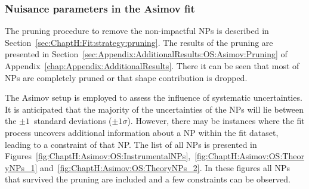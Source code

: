 \subsubsection{Nuisance parameters in the \dilepOStau Asimov fit}
\label{sec:ChaptH:Fit:ASIMOV:OS:NPs}

The pruning procedure to remove the non-impactful NPs is described in Section~\ref{sec:ChaptH:Fit:strategy:pruning}.
The results of the pruning are presented in Section~\ref{sec:Appendix:AdditionalResults:OS:Asimov:Pruning} of
Appendix~\ref{chap:Appendix:AdditionalResults}. There it can be seen that most of NPs are completely
pruned or that shape contribution is dropped.

The Asimov setup is employed to assess the influence of systematic uncertainties.
It is anticipated that the majority of the uncertainties of the NPs will lie between the 
$\pm 1$~standard deviations ($\pm 1\sigma$).
However, there may be instances where the fit process uncovers additional information 
about a NP within the fit dataset, leading to a constraint of that NP.  The list of all NPs
is presented in Figures~\ref{fig:ChaptH:Asimov:OS:InstrumentalNPs},~\ref{fig:ChaptH:Asimov:OS:TheoryNPs_1}
and~\ref{fig:ChaptH:Asimov:OS:TheoryNPs_2}. In these figures all NPs that survived the pruning are included and
a few constraints can be observed.




